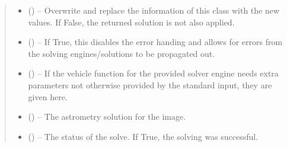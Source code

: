 \documentclass[letterpaper,11pt,english]{sphinxmanual}
\begin{document}
\begin{savenotes}
\begin{fulllineitems}
\begin{savenotes}
\begin{fulllineitems}
\begin{quote}
\begin{description}
\begin{itemize}
\item {} 
\sphinxAtStartPar
{} (\sphinxstyleliteralemphasis{\sphinxupquote{, }}) – Overwrite and replace the information of this class with the new
values. If False, the returned solution is not also applied.

\item {} 
\sphinxAtStartPar
{} (\sphinxstyleliteralemphasis{\sphinxupquote{, }}) – If True, this disables the error handing and allows for errors from
the solving engines/solutions to be propagated out.

\item {} 
\sphinxAtStartPar
{} (\sphinxstyleliteralemphasis{\sphinxupquote{, }}) – If the vehicle function for the provided solver engine needs
extra parameters not otherwise provided by the standard input,
they are given here.

\end{itemize}

\sphinxAtStartPar
\begin{itemize}
\item {} 
\sphinxAtStartPar
{} () – The astrometry solution for the image.

\item {} 
\sphinxAtStartPar
{} () – The status of the solve. If True, the solving was successful.

\end{itemize}


\end{description}\end{quote}

\end{fulllineitems}\end{savenotes}



\end{fulllineitems}
\end{savenotes}
\end{document}
